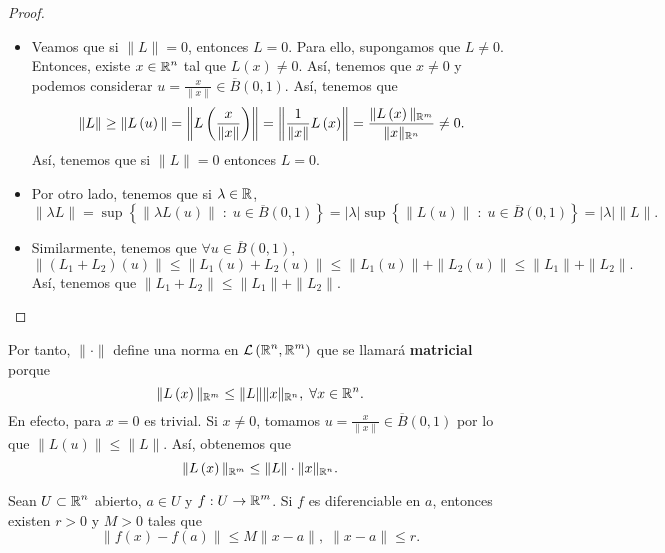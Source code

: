 \begin{proof}
	\begin{itemize}
	\item Veamos que si $\displaystyle \|L\| = 0 $, entonces $\displaystyle L = 0 $. Para ello, supongamos que $\displaystyle L \neq 0 $. Entonces, existe $\displaystyle x \in \mathbb{R}^{n} $ tal que $\displaystyle L\left(x\right) \neq 0 $. Así, tenemos que $\displaystyle x \neq 0 $ y podemos considerar $\displaystyle u = \frac{x}{\|x\|} \in \overline{B}\left(0,1\right) $. Así, tenemos que
\[ \|L\| \geq \|L\left(u\right)\| = \left\|L\left(\frac{x}{\|x\|}\right)\right\| = \left\|\frac{1}{\|x\|}L\left(x\right)\right\| = \frac{\|L\left(x\right)\|_{\mathbb{R}^{m}}}{\|x\|_{\mathbb{R}^{n}}} \neq 0.\]
Así, tenemos que si $\displaystyle \|L\| = 0 $ entonces $\displaystyle L = 0 $. 
\item Por otro lado, tenemos que si $\displaystyle \lambda \in \mathbb{R} $,
\[\|\lambda L\| = \sup \left\{ \|\lambda L\left(u\right)\| \; : \; u \in \overline{B}\left(0,1\right)\right\} = \left|\lambda \right| \sup \left\{ \|L\left(u\right)\| \; : \; u \in \overline{B}\left(0,1\right)\right\} = \left|\lambda \right| \|L\| .\]
\item Similarmente, tenemos que $\displaystyle \forall u \in \overline{B}\left(0,1\right) $,
\[\|\left(L_{1}+L_{2}\right)\left(u\right)\| \leq \|L_{1}\left(u\right) + L_{2}\left(u\right)\| \leq \|L_{1}\left(u\right)\| + \|L_{2}\left(u\right)\| \leq \|L_{1}\| + \|L_{2}\| .\]
Así, tenemos que $\displaystyle \|L_{1} + L_{2} \| \leq \|L_{1}\| + \|L_{2}\| $.
	\end{itemize}
\end{proof}
\begin{observation}
Por tanto, $\displaystyle \| \cdot \| $ define una norma en $\displaystyle \mathcal{L}\left(\mathbb{R}^{n}, \mathbb{R}^{m}\right) $ que se llamará \textbf{matricial} porque 
\[\|L\left(x\right)\|_{\mathbb{R}^{m}} \leq \|L\| \|x\|_{\mathbb{R}^{n}}, \; \forall x \in \mathbb{R}^{n} .\]
En efecto, para $\displaystyle x = 0 $ es trivial. Si $\displaystyle x \neq 0 $, tomamos $\displaystyle u = \frac{x}{\|x\|} \in \overline{B}\left(0,1\right) $ por lo que $\displaystyle \|L\left(u\right)\| \leq \|L\| $. Así, obtenemos que
\[\|L\left(x\right)\|_{\mathbb{R}^{m}} \leq \|L\| \cdot \|x\|_{\mathbb{R}^{n}} .\]
\end{observation}
\begin{prop}
Sean $\displaystyle U \subset \mathbb{R}^{n} $ abierto, $\displaystyle a \in U $ y $\displaystyle f : U \to \mathbb{R}^{m} $. Si $\displaystyle f $ es diferenciable en $\displaystyle a $, entonces existen $\displaystyle r > 0 $ y $\displaystyle M > 0 $ tales que
\[ \|f\left(x\right)-f\left(a\right)\| \leq M \|x-a\|, \;  \|x - a\| \leq r .\]
\end{prop}
